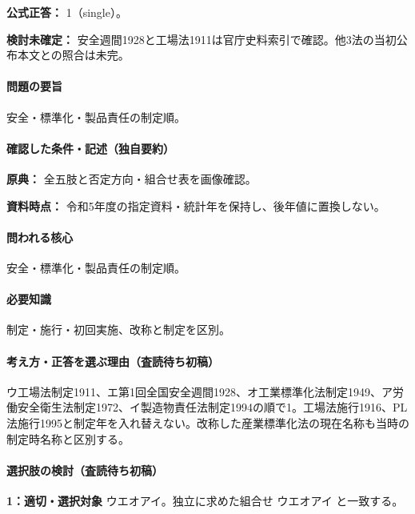 \textbf{公式正答：} 1（single）。

\par\textbf{検討未確定：} 安全週間1928と工場法1911は官庁史料索引で確認。他3法の当初公布本文との照合は未完。

\paragraph{問題の要旨} 安全・標準化・製品責任の制定順。

\paragraph{確認した条件・記述（独自要約）}\mbox{}\par

\noindent\textbf{原典：} 全五肢と否定方向・組合せ表を画像確認。\par

\noindent\textbf{資料時点：} 令和5年度の指定資料・統計年を保持し、後年値に置換しない。\par

\paragraph{問われる核心} 安全・標準化・製品責任の制定順。

\paragraph{必要知識} 制定・施行・初回実施、改称と制定を区別。

\paragraph{考え方・正答を選ぶ理由（査読待ち初稿）} ウ工場法制定1911、エ第1回全国安全週間1928、オ工業標準化法制定1949、ア労働安全衛生法制定1972、イ製造物責任法制定1994の順で1。工場法施行1916、PL法施行1995と制定年を入れ替えない。改称した産業標準化法の現在名称も当時の制定時名称と区別する。

\paragraph{選択肢の検討（査読待ち初稿）}\mbox{}\par

\noindent\textbf{1：適切・選択対象} ウエオアイ。独立に求めた組合せ ウエオアイ と一致する。\par

